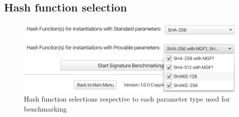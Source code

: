 \documentclass[]{final_report}
\theoremstyle{definition}
\begin{document}

\subsection{Hash function selection}

\begin{figure}[H]
    \centering 
    \includegraphics[width=\textwidth]{main_pictures/ui/hashChoices.png}
    \caption{Hash function selections respective to each parameter type used for benchmarking}
\end{figure}

\end{document}
